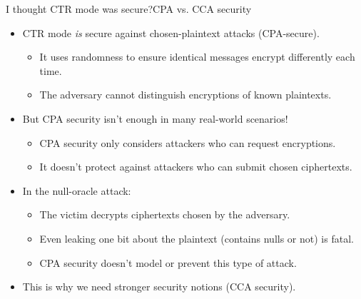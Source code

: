 \documentclass[aspectratio=169, lualatex, handout]{beamer}
\begin{document}
\begin{frame}{I thought CTR mode was secure?}{CPA vs. CCA security}
	\begin{itemize}[<+->]
		\item CTR mode \textit{is} secure against chosen-plaintext attacks (CPA-secure).
		      \begin{itemize}
			      \item It uses randomness to ensure identical messages encrypt differently each time.
			      \item The adversary cannot distinguish encryptions of known plaintexts.
		      \end{itemize}
		\item But CPA security isn't enough in many real-world scenarios!
		      \begin{itemize}
			      \item CPA security only considers attackers who can request encryptions.
			      \item It doesn't protect against attackers who can submit chosen ciphertexts.
		      \end{itemize}
		\item In the null-oracle attack:
		      \begin{itemize}
			      \item The victim decrypts ciphertexts chosen by the adversary.
			      \item Even leaking one bit about the plaintext (contains nulls or not) is fatal.
			      \item CPA security doesn't model or prevent this type of attack.
		      \end{itemize}
		\item This is why we need stronger security notions (CCA security).
	\end{itemize}
\end{frame}
\end{document}
